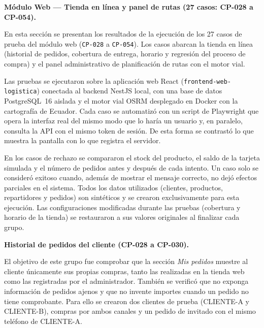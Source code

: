 \par\medskip\noindent\textbf{Módulo Web --- Tienda en línea y panel de rutas (27 casos: CP-028 a CP-054).}\par\smallskip
En esta sección se presentan los resultados de la ejecución de los 27 casos de prueba del módulo web
(\texttt{CP-028} a \texttt{CP-054}). Los casos abarcan la tienda en línea (historial de pedidos,
cobertura de entrega, horario y regresión del proceso de compra) y el panel administrativo de
planificación de rutas con el motor vial.

Las pruebas se ejecutaron sobre la aplicación web React (\texttt{frontend-web-logistica}) conectada
al backend NestJS local, con una base de datos PostgreSQL~16 aislada y el motor vial OSRM desplegado
en Docker con la cartografía de Ecuador. Cada caso se automatizó con un script de Playwright que opera
la interfaz real del mismo modo que lo haría un usuario y, en paralelo, consulta la API con el mismo
token de sesión. De esta forma se contrastó lo que muestra la pantalla con lo que registra el servidor.

En los casos de rechazo se compararon el stock del producto, el saldo de la tarjeta simulada y el
número de pedidos antes y después de cada intento. Un caso solo se consideró exitoso cuando, además
de mostrar el mensaje correcto, no dejó efectos parciales en el sistema. Todos los datos utilizados
(clientes, productos, repartidores y pedidos) son sintéticos y se crearon exclusivamente para esta
ejecución. Las configuraciones modificadas durante las pruebas (cobertura y horario de la tienda) se
restauraron a sus valores originales al finalizar cada grupo.

\par\medskip\noindent\textbf{Historial de pedidos del cliente (CP-028 a CP-030).}\par\smallskip
El objetivo de este grupo fue comprobar que la sección \emph{Mis pedidos} muestre al cliente
únicamente sus propias compras, tanto las realizadas en la tienda web como las registradas por el
administrador. También se verificó que no exponga información de pedidos ajenos y que no invente
importes cuando un pedido no tiene comprobante. Para ello se crearon dos clientes de prueba
(CLIENTE-A y CLIENTE-B), compras por ambos canales y un pedido de invitado con el mismo teléfono de
CLIENTE-A.

